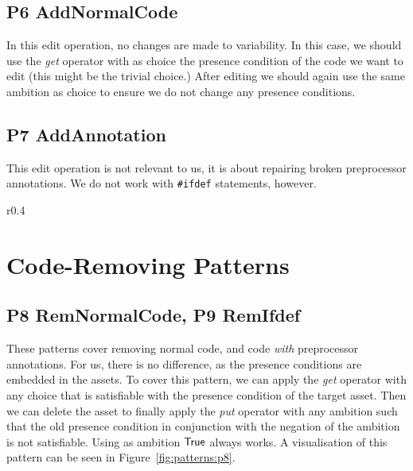 \subsection*{P6 AddNormalCode}
In this edit operation, no changes are made to variability. In this case, we
should use the \emph{get} operator with as choice the presence condition of the
code we want to edit (this might be the trivial choice.) After editing we
should again use the same ambition as choice to ensure we do not change any
presence conditions.

\subsection*{P7 AddAnnotation}
This edit operation is not relevant to us, it is about repairing broken 
preprocessor annotations. We do not work with \texttt{\#ifdef} statements,
however.

\begin{wrapfigure}{r}{0.4\textwidth}
  \centering
  \caption{Workflow for removing assets, relevant for patterns \emph{P8} and \emph{P9}.}
  \label{fig:patterns:p8}
\end{wrapfigure}
\section{Code-Removing Patterns}
\subsection*{P8 RemNormalCode, P9 RemIfdef}
These patterns cover removing normal code, and code \emph{with} preprocessor
annotations. For us, there is no difference, as the presence conditions are
embedded in the assets. To cover this pattern, we can apply the
\emph{get} operator with any choice that is satisfiable with the presence
condition of the target asset. Then we can delete the asset to finally apply
the \emph{put} operator with any ambition such that the old presence condition
in conjunction with the negation of the ambition is not satisfiable. Using as
ambition \({\sf True}\) always works. A visualisation of this pattern can be
seen in Figure~\ref{fig:patterns:p8}.

